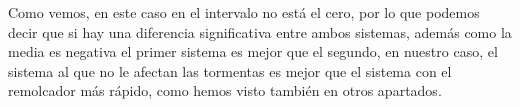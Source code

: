 \documentclass[12pt, spanish]{article}
\begin{document}
Como vemos, en este caso en el intervalo no está el cero, por lo que podemos decir que si hay una diferencia significativa entre ambos sistemas, además como la media es negativa el primer sistema es mejor que el segundo, en nuestro caso, el sistema al que no le afectan las tormentas es mejor que el sistema con el remolcador más rápido, como hemos visto también en otros apartados.


%
%
\end{document}
